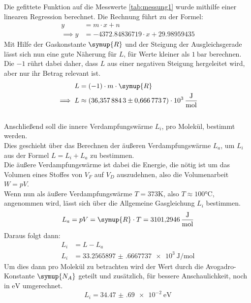 Die gefittete Funktion auf die Messwerte \ref{tab:messung1} wurde mithilfe einer linearen Regression berechnet.
Die Rechnung führt zu der Formel:
\begin{align}
    y&=m\cdot x+n \nonumber\\
    \implies y&=-4372.84836719 \cdot x+29.98959435 \label{eqn:fit1}
\end{align}
Mit Hilfe der Gaskonstante $\symup{R}$ \cite{Chemie.de-Gaskonstante}
und der Steigung der Ausgleichsgerade lässt sich nun eine gute Näherung für $L$, für Werte kleiner als $\SI{1}{\bar}$ berechnen.
Die $-1$ rührt dabei daher, dass $L$ aus einer negativen Steigung hergeleitet wird, aber nur ihr Betrag relevant ist.
\begin{align}
    L&=(-1) \cdot m \cdot \symup{R} \nonumber\\
    \implies L&\approx\SI{36.3578843(6667737)e3}{\joule\per\mol} \nonumber
\end{align}\\
Anschließend soll die innere Verdampfungswärme $L_i$, pro Molekül, bestimmt werden.\\
Dies geschieht über das Berechnen der äußeren Verdampfungswärme $L_a$, um $L_i$ aus der Formel $L=L_i+L_a$ zu bestimmen.\\
Die äußere Verdampfungswärme ist dabei die Energie, die nötig ist um das Volumen eines Stoffes von $V_F$ auf $V_D$ auszudehnen,
also die Volumenarbeit $W=pV$.\\
Wenn nun als äußere Verdampfungswärme $T=373 \si{\kelvin}$, also $T\approx 100 \si{\celsius}$, angenommen wird, lässt sich über die Allgemeine Gasgleichung $L_i$ bestimmen.
\begin{equation}
    L_a=pV=\symup{R} \cdot T = \SI{3101.2946}{\joule\per\mol} \nonumber
\end{equation}
Daraus folgt dann:
\begin{align}
    L_i&=L-L_a \nonumber\\
    L_i&=\SI{33.2565897(6667737)e3}{\joule\per\mol} \nonumber
\end{align}
Um dies dann pro Molekül zu betrachten wird der Wert durch die Avogadro-Konstante $\symup{N_A}$ \cite{Chemie.de-Avogadro-Konstante}
geteilt und zusätzlich, für bessere Anschaulichkeit,
noch in $\si{\electronvolt}$ umgerechnet.
\begin{equation}
    L_i=\SI{34.47(69)e-2}{\electronvolt} \nonumber
\end{equation}

\clearpage


